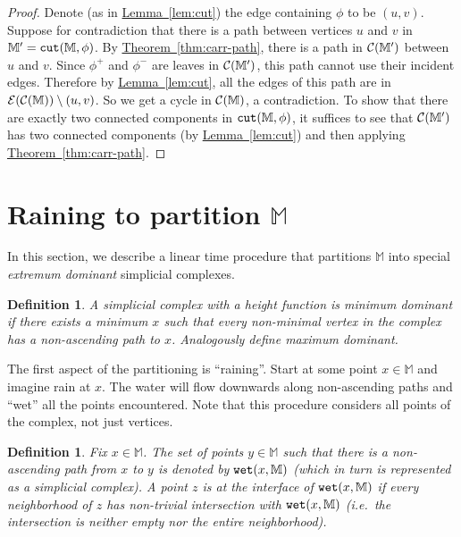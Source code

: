 \documentclass[11pt]{article}
\newtheorem{lemma}[theorem]{Lemma}
\newtheorem{definition}[theorem]{Definition}
\theoremstyle{definition}
\newcommand{\cC}{{\cal C}}
\newcommand{\cE}{{\cal E}}
\newcommand{\MM}{\mathbb{M}}
\newcommand{\Thm}[1]{\hyperref[thm:#1]{Theorem~\ref*{thm:#1}}} %
\newcommand{\Lem}[1]{\hyperref[lem:#1]{Lemma~\ref*{lem:#1}}} %
\newcommand{\cut}{{\tt cut}}
\newcommand{\wet}{{\tt wet}}
\begin{document}
\begin{proof} Denote (as in \Lem{cut}) the edge containing $\phi$ to be $(u,v)$. Suppose for contradiction that there is a path between vertices $u$ and $v$
in $\MM' = \cut(\MM,\phi)$. By \Thm{carr-path}, there is a path in $\cC(\MM')$ between $u$ and $v$. Since $\phi^+$ and $\phi^-$
are leaves in $\cC(\MM')$, this path cannot use their incident edges. Therefore by \Lem{cut},
all the edges of this path are in $\cE(\cC(\MM)) \setminus (u,v)$. So we get a cycle in $\cC(\MM)$, a contradiction.
To show that there are exactly two connected components in $\cut(\MM,\phi)$, it suffices
to see that $\cC(\MM')$ has two connected components (by \Lem{cut}) and then applying \Thm{carr-path}.
\end{proof}

% 
% 




\section{Raining to partition $\MM$} \label{sec:rain}

In this section, we describe a linear time procedure that partitions $\MM$ into special
\emph{extremum dominant} simplicial complexes.

\begin{definition} \label{def:dom} A simplicial complex with a height function is \emph{minimum dominant} if there exists
a minimum $x$ such that every non-minimal \emph{vertex} in the complex has a non-ascending path to $x$.
Analogously define \emph{maximum dominant}. 
\end{definition}

The first aspect of the partitioning is ``raining''. Start at some point $x \in \MM$ and imagine rain at $x$.
The water will flow downwards along non-ascending paths and ``wet'' all the points encountered. Note that this procedure considers all points
of the complex, not just vertices.

\begin{definition} \label{def:wet} Fix $x \in \MM$. The set of points $y \in \MM$ such that there is a non-ascending path from $x$ to $y$
is denoted by $\wet(x,\MM)$ (which in turn is represented as a simplicial complex). A point $z$ is at the \emph{interface} of $\wet(x,\MM)$ if every neighborhood of $z$
has non-trivial intersection with $\wet(x,\MM)$ (i.e.\ the intersection is neither empty nor the entire neighborhood).
\end{definition}
\end{document}
